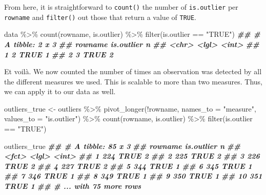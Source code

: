 \documentclass[
]{book}
\newenvironment{Shaded}{\begin{snugshade}}{\end{snugshade}}
\newcommand{\AttributeTok}[1]{\textcolor[rgb]{0.77,0.63,0.00}{#1}}
\newcommand{\DocumentationTok}[1]{\textcolor[rgb]{0.56,0.35,0.01}{\textbf{\textit{#1}}}}
\newcommand{\FunctionTok}[1]{\textcolor[rgb]{0.00,0.00,0.00}{#1}}
\newcommand{\NormalTok}[1]{#1}
\newcommand{\OtherTok}[1]{\textcolor[rgb]{0.56,0.35,0.01}{#1}}
\newcommand{\SpecialCharTok}[1]{\textcolor[rgb]{0.00,0.00,0.00}{#1}}
\newcommand{\StringTok}[1]{\textcolor[rgb]{0.31,0.60,0.02}{#1}}
\begin{document}
From here, it is straightforward to \texttt{count()} the number of \texttt{is.outlier} per \texttt{rowname} and \texttt{filter()} out those that return a value of \texttt{TRUE}.

\begin{Shaded}
\begin{Highlighting}[]
\NormalTok{data }\SpecialCharTok{\%\textgreater{}\%}
  \FunctionTok{count}\NormalTok{(rowname, is.outlier) }\SpecialCharTok{\%\textgreater{}\%}
  \FunctionTok{filter}\NormalTok{(is.outlier }\SpecialCharTok{==} \StringTok{"TRUE"}\NormalTok{)}
\DocumentationTok{\#\# \# A tibble: 2 x 3}
\DocumentationTok{\#\#   rowname is.outlier     n}
\DocumentationTok{\#\#   \textless{}chr\textgreater{}   \textless{}lgl\textgreater{}      \textless{}int\textgreater{}}
\DocumentationTok{\#\# 1 2       TRUE           1}
\DocumentationTok{\#\# 2 3       TRUE           2}
\end{Highlighting}
\end{Shaded}

Et voilà. We now counted the number of times an observation was detected by all the different measures we used. This is scalable to more than two measures. Thus, we can apply it to our data as well.

\begin{Shaded}
\begin{Highlighting}[]
\NormalTok{outliers\_true }\OtherTok{\textless{}{-}}\NormalTok{ outliers }\SpecialCharTok{\%\textgreater{}\%}
  \FunctionTok{pivot\_longer}\NormalTok{(}\SpecialCharTok{!}\NormalTok{rowname,}
               \AttributeTok{names\_to =} \StringTok{"measure"}\NormalTok{,}
               \AttributeTok{values\_to =} \StringTok{"is.outlier"}\NormalTok{) }\SpecialCharTok{\%\textgreater{}\%}
  \FunctionTok{count}\NormalTok{(rowname, is.outlier) }\SpecialCharTok{\%\textgreater{}\%}
  \FunctionTok{filter}\NormalTok{(is.outlier }\SpecialCharTok{==} \StringTok{"TRUE"}\NormalTok{)}

\NormalTok{outliers\_true}
\DocumentationTok{\#\# \# A tibble: 85 x 3}
\DocumentationTok{\#\#    rowname is.outlier     n}
\DocumentationTok{\#\#    \textless{}fct\textgreater{}   \textless{}lgl\textgreater{}      \textless{}int\textgreater{}}
\DocumentationTok{\#\#  1 224     TRUE           2}
\DocumentationTok{\#\#  2 225     TRUE           2}
\DocumentationTok{\#\#  3 226     TRUE           2}
\DocumentationTok{\#\#  4 227     TRUE           2}
\DocumentationTok{\#\#  5 344     TRUE           1}
\DocumentationTok{\#\#  6 345     TRUE           1}
\DocumentationTok{\#\#  7 346     TRUE           1}
\DocumentationTok{\#\#  8 349     TRUE           1}
\DocumentationTok{\#\#  9 350     TRUE           1}
\DocumentationTok{\#\# 10 351     TRUE           1}
\DocumentationTok{\#\# \# ... with 75 more rows}
\end{Highlighting}
\end{Shaded}
\end{document}
